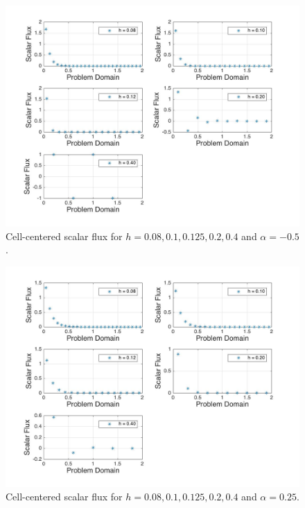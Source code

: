 \documentclass[10pt]{article}
\begin{document}
\begin{figure}[H]
  \centering
  \includegraphics[width=16cm]{ScalarFlux1-50.jpg} %
  \caption{Cell-centered scalar flux for \(h=0.08, 0.1, 0.125, 0.2, 0.4\) and \(\alpha=-0.5\).}
\end{figure}

\begin{figure}[H]
  \centering
  \includegraphics[width=16cm]{ScalarFlux225.jpg} %
  \caption{Cell-centered scalar flux for \(h=0.08, 0.1, 0.125, 0.2, 0.4\) and \(\alpha=0.25\).}
\end{figure}
\end{document}

